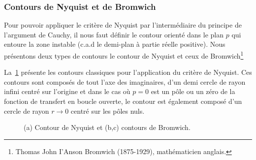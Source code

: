 \subsubsection{Contours de Nyquist et de Bromwich}

Pour pouvoir appliquer le critère de Nyquist par l'intermédiaire du principe 
de l'argument de Cauchy, il nous faut définir le contour orienté dans le plan 
$p$ qui entoure la zone instable (c.a.d le demi-plan à partie réelle positive).
Nous présentons deux types de contours le contour de Nyquist et ceux de 
Bromwich\footnote{Thomas John I'Anson Bromwich (1875-1929), mathématicien 
anglais.}

La~\cref{fig-contours} présente les contours classiques pour l'application 
du critère de Nyquist. Ces contours sont composés de tout l'axe des 
imaginaires, d'un demi cercle de rayon infini centré sur l'origine et dans le
cas où $p=0$ est un pôle ou un zéro de la fonction de transfert en boucle 
ouverte, le contour est également composé d'un cercle de rayon 
$r\rightarrow0$ centré sur les pôles nuls.

\captionsetup{width=.9\linewidth} 
\begin{figure}[!h]
    \centering
    
    \caption{(a) Contour de Nyquist et 
             (b,c) contours de Bromwich.\label{fig-contours}} 
\end{figure}
\captionsetup{width=.85\linewidth} 
